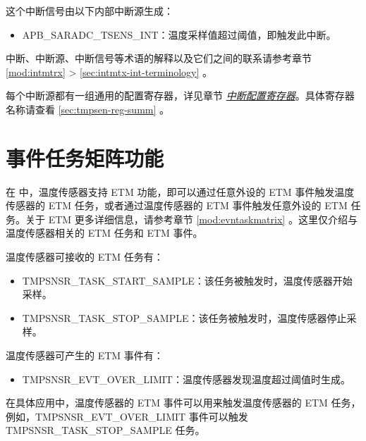 \documentclass[main\_\_CN.tex]{subfiles}
\begin{document}
这个中断信号由以下内部中断源生成：
    \begin{itemize}
        \item \label{int:APBSARADCTSENSINT} APB\_SARADC\_TSENS\_INT：温度采样值超过阈值，即触发此中断。
    \end{itemize}

\begin{tiplisting}
中断、中断源、中断信号等术语的解释以及它们之间的联系请参考章节 \ref{mod:intmtrx} \textit{} > \ref{sec:intmtx-int-terminology} \textit{}。
\end{tiplisting}

每个中断源都有一组通用的配置寄存器，详见章节 \hyperref[interrupt-config-registers]{\textit{中断配置寄存器}}。具体寄存器名称请查看 \ref{sec:tmpsen-reg-summ} \textit{}。



\section{事件任务矩阵功能}
\label{sec:tmpsen-etm-func}

在 \chipname{} 中，温度传感器支持 ETM 功能，即可以通过任意外设的 ETM 事件触发温度传感器的 ETM 任务，或者通过温度传感器的 ETM 事件触发任意外设的 ETM 任务。关于 ETM 更多详细信息，请参考章节 \ref{mod:evntaskmatrix} \textit{}。这里仅介绍与温度传感器相关的 ETM 任务和 ETM 事件。

温度传感器可接收的 ETM 任务有：

\begin{itemize}
    \item TMPSNSR\_TASK\_START\_SAMPLE：该任务被触发时，温度传感器开始采样。
    \item TMPSNSR\_TASK\_STOP\_SAMPLE：该任务被触发时，温度传感器停止采样。
\end{itemize}

温度传感器可产生的 ETM 事件有：

\begin{itemize}
    \item TMPSNSR\_EVT\_OVER\_LIMIT：温度传感器发现温度超过阈值时生成。
\end{itemize}

在具体应用中，温度传感器的 ETM 事件可以用来触发温度传感器的 ETM 任务，例如，TMPSNSR\_EVT\_OVER\_LIMIT 事件可以触发 TMPSNSR\_TASK\_STOP\_SAMPLE 任务。
\end{document}
